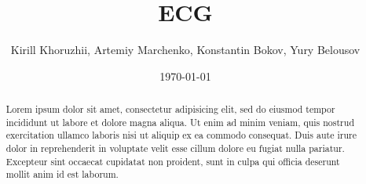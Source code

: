 \documentclass[reprint,amsmath,amssymb,aps,prb]{revtex4-2}
\begin{document}
\title{ECG}

\author{Kirill Khoruzhii, Artemiy Marchenko, Konstantin Bokov, Yury Belousov}

\date{\today}%

\begin{abstract}
Lorem ipsum dolor sit amet, consectetur adipisicing elit, sed do eiusmod
tempor incididunt ut labore et dolore magna aliqua. Ut enim ad minim veniam,
quis nostrud exercitation ullamco laboris nisi ut aliquip ex ea commodo
consequat. Duis aute irure dolor in reprehenderit in voluptate velit esse
cillum dolore eu fugiat nulla pariatur. Excepteur sint occaecat cupidatat non
proident, sunt in culpa qui officia deserunt mollit anim id est laborum.
\end{abstract}






\end{document}
